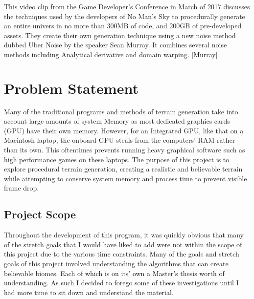 \documentclass[12pt]{article}
\begin{document}
        This video clip from the Game Developer's Conference in March of 2017 discusses the techniques used by the 
        developers of No Man's Sky to procedurally generate an entire univers in no more than 300MB of code, and 200GB of 
        pre-developed assets. They create their own generation technique using a new noise method dubbed Uber Noise by 
        the speaker Sean Murray. It combines several noise methods including Analytical derivative and domain warping. [Murray]

\section{Problem Statement}

    Many of the traditional programs and methods of terrain generation take into account large amounts of system Memory
    as most dedicated graphics cards (GPU) have their own memory. However, for an Integrated GPU, like that on a Macintosh laptop,
    the onboard GPU steals from the computers' RAM rather than its own. This oftentimes prevents running heavy graphical 
    software such as high performance games on these laptops. The purpose of this project is to explore procedural terrain
    generation, creating a realistic and believable terrain while attempting to conserve system memory and process time
    to prevent visible frame drop.

    \subsection{Project Scope}
        Throughout the development of this program, it was quickly obvious that many of the stretch goals that I would 
        have liked to add were not within the scope of this project due to the various time constraints. Many of the goals
        and stretch goals of this project involved understanding the algorithms that can create believable biomes. 
        Each of which is on its' own a Master's thesis worth of understanding. As such I decided to forego some of these
        investigations until I had more time to sit down and understand the material.
\end{document}
